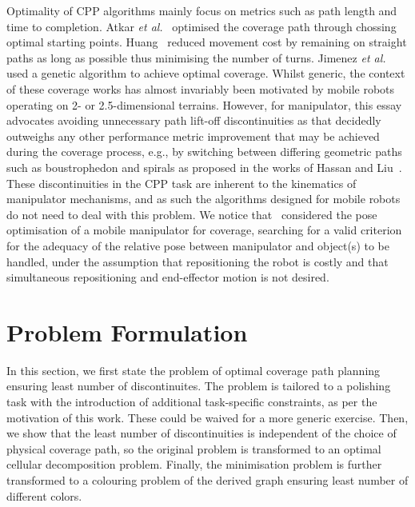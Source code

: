 \documentclass[journal]{IEEEtran}
\begin{document}
Optimality of CPP algorithms mainly focus on metrics such as path length and time to completion.
Atkar \textit{et al.}~\cite{Atkar2003Towards} optimised the coverage path through chossing optimal starting points. 
Huang~\cite{huang2001optimal} reduced movement cost by remaining on straight paths as long as possible thus minimising the number of turns. 
Jimenez \textit{et al.}~\cite{jimenez2007optimal} used a genetic algorithm to achieve optimal coverage. 
Whilst generic, the context of these coverage works has almost invariably been motivated by mobile robots operating on 2- or 2.5-dimensional terrains. However, for manipulator, this essay advocates avoiding unnecessary path lift-off discontinuities as that decidedly outweighs any other performance metric improvement that may be achieved during the coverage process, e.g., by switching between differing geometric paths such as boustrophedon and spirals as proposed in the works of Hassan and Liu~\cite{hassan2018a}. 
These discontinuities in the CPP task are inherent to the kinematics of manipulator mechanisms, and as such the algorithms designed for mobile robots do not need to deal with this problem. 
We notice that~\cite{paus2017a} considered the pose 
optimisation of a mobile manipulator for coverage, searching for a valid criterion for the adequacy of the relative pose between manipulator and object(s) to be handled, under the assumption that repositioning the robot is costly and that simultaneous repositioning and end-effector motion is not desired. 

\section{Problem Formulation}\label{sectionproblemformulation}
In this section, we first state the problem of optimal coverage path planning ensuring least number of discontinuites.
The problem is tailored to a polishing task with the introduction of additional task-specific constraints, as per the motivation of this work. These could be waived for a more generic exercise. %
Then, we show that the least number of discontinuities is independent of the choice of physical coverage path, 
so the original problem is transformed to an optimal cellular decomposition problem. 
Finally, the minimisation problem is further transformed to a colouring problem of the derived graph ensuring least number of different colors. 
\end{document}
